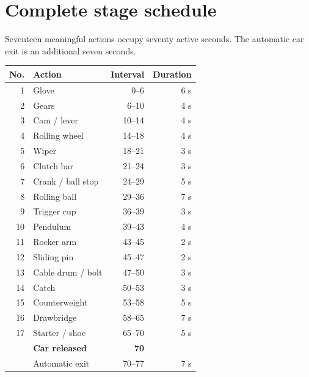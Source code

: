 \documentclass[a4paper,10pt]{article}
\newcommand{\lead}[1]{{\sffamily\color{muted}\normalsize #1\par}\vspace{3pt}}
\newcommand{\reportpage}[2]{\newpage\section{#1}\label{section:\thesection}\lead{#2}}
\numberwithin{equation}{section}
\begin{document}
\reportpage{Complete stage schedule}{Seventeen meaningful actions occupy seventy active seconds. The automatic car exit is an additional seven seconds.}
\par\noindent\begin{minipage}[t]{.50\linewidth}\vspace{0pt}
\small
\par\noindent\begin{tabular}{@{}r l r r@{}}
\toprule
\textbf{No.}&\textbf{Action}&\textbf{Interval}&\textbf{Duration}\\\midrule
1&Glove&0--6&6 s\\
2&Gears&6--10&4 s\\
3&Cam / lever&10--14&4 s\\
4&Rolling wheel&14--18&4 s\\
5&Wiper&18--21&3 s\\
6&Clutch bar&21--24&3 s\\
7&Crank / ball stop&24--29&5 s\\
8&Rolling ball&29--36&7 s\\
9&Trigger cup&36--39&3 s\\
10&Pendulum&39--43&4 s\\
11&Rocker arm&43--45&2 s\\
12&Sliding pin&45--47&2 s\\
13&Cable drum / bolt&47--50&3 s\\
14&Catch&50--53&3 s\\
15&Counterweight&53--58&5 s\\
16&Drawbridge&58--65&7 s\\
17&Starter / shoe&65--70&5 s\\\midrule
&\textbf{Car released}&\textbf{70}&\\
&Automatic exit&70--77&7 s\\
\bottomrule
\end{tabular}\par
\end{minipage}\hfill
\end{document}
